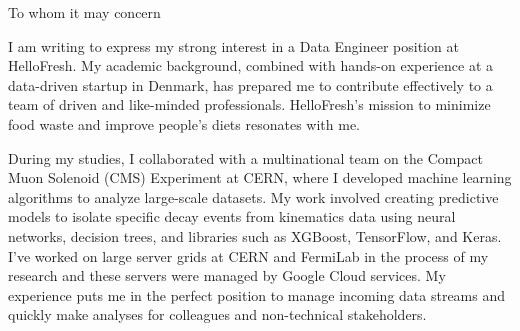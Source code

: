 \documentclass[11pt,a4]{article}
\begin{document}




To whom it may concern

I am writing to express my strong interest in a Data Engineer position at HelloFresh. My academic background, combined with hands-on experience at a data-driven startup in Denmark, has prepared me to contribute effectively to a team of driven and like-minded professionals. HelloFresh's mission to minimize food waste and improve people's diets resonates with me.

During my studies, I collaborated with a multinational team on the Compact Muon Solenoid (CMS) Experiment at CERN, where I developed machine learning algorithms to analyze large-scale datasets. My work involved creating predictive models to isolate specific decay events from kinematics data using neural networks, decision trees, and libraries such as XGBoost, TensorFlow, and Keras. I've worked on large server grids at CERN and FermiLab in the process of my research and these servers were managed by Google Cloud services. My experience puts me in the perfect position to manage incoming data streams and quickly make analyses for colleagues and non-technical stakeholders.
\end{document}
